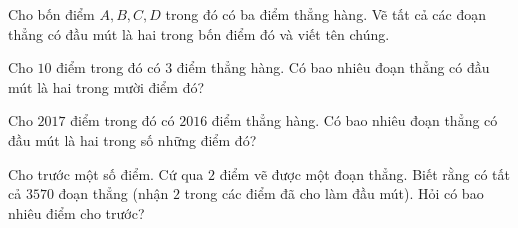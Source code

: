 \begin{bt}
\end{bt}   \begin{bt}
Cho bốn điểm $A, B, C, D$ trong đó có ba điểm thẳng hàng. Vẽ tất cả các đoạn thẳng có đầu mút là hai trong bốn điểm đó và viết tên chúng.
\end{bt}   \begin{bt}
Cho $10$ điểm trong đó có $3$ điểm thẳng hàng. Có bao nhiêu đoạn thẳng có đầu mút là hai trong mười điểm đó?
\end{bt}   \begin{bt}
Cho $2017$ điểm trong đó có $2016$ điểm thẳng hàng. Có bao nhiêu đoạn thẳng có đầu mút là hai trong số những điểm đó?
\end{bt}   \begin{bt}
Cho trước một số điểm. Cứ qua $2$ điểm vẽ được một đoạn thẳng. Biết rằng có tất cả $3570$ đoạn thẳng (nhận $2$ trong các điểm đã cho làm đầu mút). Hỏi có bao nhiêu điểm cho trước?

\end{bt} 